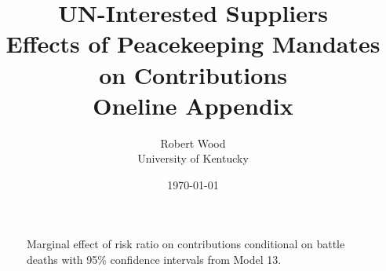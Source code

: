 \documentclass[12pt]{article}
\title{UN-Interested Suppliers \\
\large Effects of Peacekeeping Mandates on Contributions \\
\large \textbf{Oneline Appendix}}
\author{Robert Wood \\
University of Kentucky}
\date{\today}
\renewcommand{\thesection}{\Roman{section}}
\begin{document}
\begin{titlingpage}
\maketitle
\end{titlingpage}

\appendix 

\renewcommand{\thesection}{Appendix \Alph{section}}
\setcounter{section}{0}

\renewcommand{\thetable}{\Alph{section}\arabic{table}}
\setcounter{table}{0}

\renewcommand{\thefigure}{\Alph{section}\arabic{figure}}
\setcounter{figure}{0}

\begin{landscape}
\begin{centering}
\section{}
\end{centering}

\end{landscape}


\begin{figure}[t!]
\caption{\small Marginal effect of risk ratio on contributions conditional on battle deaths with 95\% confidence intervals from Model 13.}
\label{fig:Figure 6}
\end{figure}

\clearpage

\begin{centering}
\section{}
\setcounter{table}{0}
\end{centering}

\vspace{-3em}

\begin{singlespace}
\begin{center}

\end{center}
\end{singlespace}

\newpage

\begin{centering}
\section{}
\setcounter{table}{0}
\end{centering}
\end{document}
